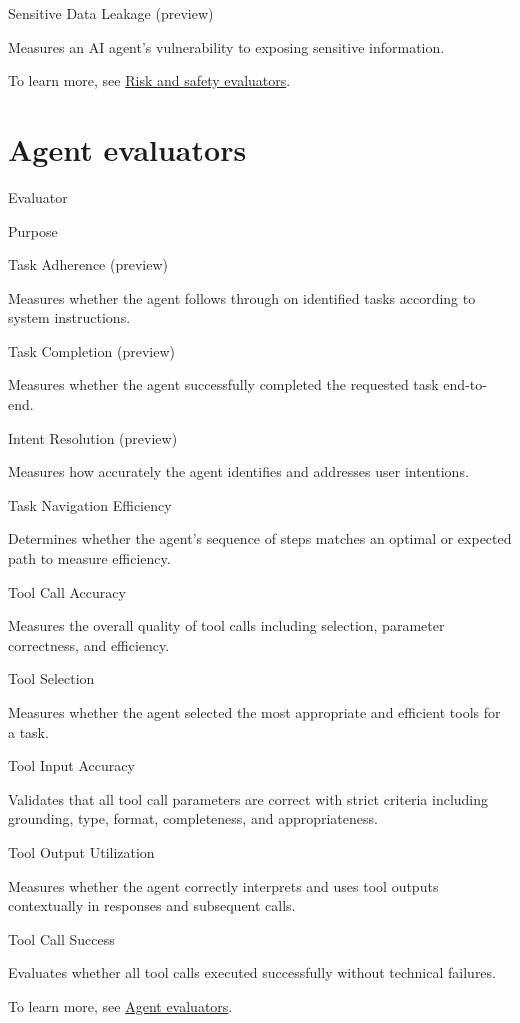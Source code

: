 \documentclass[
  letterpaper,
  DIV=11,
  numbers=noendperiod,
  oneside]{scrreprt}
\begin{document}
\begin{tcolorbox}
Sensitive Data Leakage (preview)

Measures an AI agent's vulnerability to exposing sensitive information.

To learn more, see
\href{https://learn.microsoft.com/en-us/azure/foundry/concepts/evaluation-evaluators/risk-safety-evaluators}{Risk
and safety evaluators}.

\section{Agent evaluators}\label{agent-evaluators}

Evaluator

Purpose

Task Adherence (preview)

Measures whether the agent follows through on identified tasks according
to system instructions.

Task Completion (preview)

Measures whether the agent successfully completed the requested task
end-to-end.

Intent Resolution (preview)

Measures how accurately the agent identifies and addresses user
intentions.

Task Navigation Efficiency

Determines whether the agent's sequence of steps matches an optimal or
expected path to measure efficiency.

Tool Call Accuracy

Measures the overall quality of tool calls including selection,
parameter correctness, and efficiency.

Tool Selection

Measures whether the agent selected the most appropriate and efficient
tools for a task.

Tool Input Accuracy

Validates that all tool call parameters are correct with strict criteria
including grounding, type, format, completeness, and appropriateness.

Tool Output Utilization

Measures whether the agent correctly interprets and uses tool outputs
contextually in responses and subsequent calls.

Tool Call Success

Evaluates whether all tool calls executed successfully without technical
failures.

To learn more, see
\href{https://learn.microsoft.com/en-us/azure/foundry/concepts/evaluation-evaluators/agent-evaluators}{Agent
evaluators}.


\end{tcolorbox}
\end{document}
